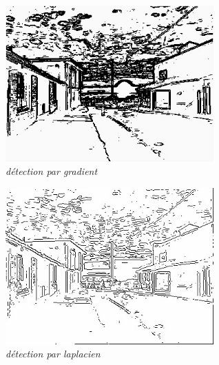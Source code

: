 \documentclass[a4,12pt]{article}
\begin{document}
\begin{center}
	\begin{minipage}[c]{0.49\linewidth}
		\begin{center}
			\includegraphics[width = 80mm]{./img/p2test_grad_mean_soleil.jpg}\\
			\textit{détection par gradient}\\
		\end{center}
	\end{minipage}
	\begin{minipage}[c]{0.49\linewidth}
		\begin{center}
			\includegraphics[width = 80mm]{./img/ctrcouchersoleil-1_5.jpg}\\
			\textit{détection par laplacien}\\
		\end{center}
	\end{minipage}
\end{center}
\end{document}
